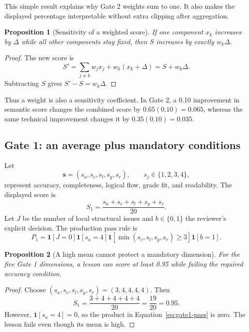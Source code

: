 \documentclass[11pt]{article}
\newcommand{\ind}[1]{\mathbf{1}\!\left[#1\right]}
\theoremstyle{plain}
\newtheorem{proposition}{Proposition}[section]
\theoremstyle{definition}
\begin{document}
This simple result explains why Gate 2 weights sum to one. It also makes the displayed percentage interpretable without extra clipping after aggregation.

\begin{proposition}[Sensitivity of a weighted score]
If one component $x_k$ increases by $\Delta$ while all other components stay fixed, then $S$ increases by exactly $w_k\Delta$.
\end{proposition}

\begin{proof}
The new score is
\[
S'=\sum_{j\ne k}w_jx_j+w_k(x_k+\Delta)=S+w_k\Delta.
\]
Subtracting $S$ gives $S'-S=w_k\Delta$.
\end{proof}

Thus a weight is also a sensitivity coefficient. In Gate 2, a 0.10 improvement in semantic score changes the combined score by $0.65(0.10)=0.065$, whereas the same technical improvement changes it by $0.35(0.10)=0.035$.

\subsection{Gate 1: an average plus mandatory conditions}

Let
\[
\mathbf{s}=(s_a,s_c,s_l,s_g,s_r),\qquad s_j\in\{1,2,3,4\},
\]
represent accuracy, completeness, logical flow, grade fit, and readability. The displayed score is
\begin{equation}
S_1=\frac{s_a+s_c+s_l+s_g+s_r}{20}.
\label{eq:gate1-score}
\end{equation}
Let $J$ be the number of local structural issues and $b\in\{0,1\}$ the reviewer's explicit decision. The production pass rule is
\begin{equation}
P_1=\ind{J=0}\ind{s_a=4}\ind{\min(s_c,s_l,s_g,s_r)\ge3}\ind{b=1}.
\label{eq:gate1-pass}
\end{equation}

\begin{proposition}[A high mean cannot protect a mandatory dimension]
\label{prop:noncomp}
For the five Gate 1 dimensions, a lesson can score at least 0.95 while failing the required accuracy condition.
\end{proposition}

\begin{proof}
Choose $(s_a,s_c,s_l,s_g,s_r)=(3,4,4,4,4)$. Then
\[
S_1=\frac{3+4+4+4+4}{20}=\frac{19}{20}=0.95.
\]
However, $\ind{s_a=4}=0$, so the product in Equation~\eqref{eq:gate1-pass} is zero. The lesson fails even though its mean is high.
\end{proof}
\end{document}
